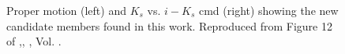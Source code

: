  \begin{figure}[ht]
\begin{center}
\caption{Proper motion (left) and $K_s$ vs. $i-K_s$ \gls{cmd} (right) showing the new candidate members found in this work. Reproduced from Figure 12 of \citet{Olivares2017},\textit{}, , Vol. .}
\label{fig:newones}
\end{center}
\end{figure}


